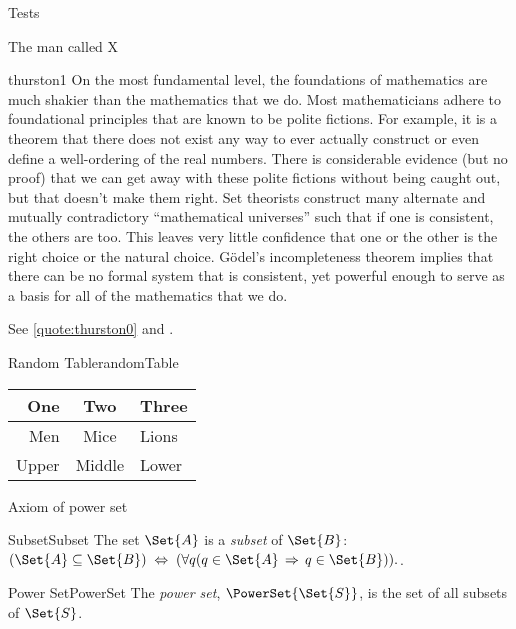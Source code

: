 \documentclass{PalisadesLakesBook}
\begin{document}
\begin{plSection}{Tests}
\begin{plSection}{The man called X}
\begin{plQuote}
{}
{thurston1}
{On the most fundamental level, the foundations of mathematics 
are much shakier than the mathematics that we do. 
Most mathematicians adhere to foundational principles 
that are known to be polite fictions. 
For example, it is a theorem that there does not exist any way 
to ever actually construct or even define a well-ordering
of the real numbers. 
There is considerable evidence (but no proof) that we can get
away with these polite fictions without being caught out, 
but that doesn’t make them right. 
Set theorists construct many alternate and mutually contradictory
“mathematical universes” such that if one is consistent, 
the others are too. 
This leaves very little confidence that one or the other is 
the right choice or the natural choice. 
G\"odel’s incompleteness theorem implies 
that there can be no formal system that is consistent, 
yet powerful enough to serve as a basis 
for all of the mathematics that we do.}%
\end{plQuote}

See \cref{quote:thurston0} and .

\end{plSection}%

\begin{plTable}{Random Table}{randomTable}
  \begin{tabular}{r|c|l}
  One   & Two    & Three \\\hline\hline
  Men   & Mice   & Lions \\\hline
  Upper & Middle & Lower
  \end{tabular}
  \end{plTable}

\begin{plSection}{Axiom of power set}
\label{sec:Axiom-of-power-set}

\begin{plDefinition}{Subset}{Subset}
The set $\Set{A}$ is a \textsl{subset} of $\Set{B}$:
$
(\Set{A} \subseteq \Set{B}) \;
 \Leftrightarrow \;
 (\forall q (q \in \Set{A} \, \Rightarrow \, q \in \Set{B})).
$.
\end{plDefinition}
 
\begin{plDefinition}{Power Set}{PowerSet}
The \emph{power set}, $\PowerSet{\Set{S}}$,
 is the set of all subsets of $\Set{S}$.
\end{plDefinition}


\end{plSection}
\end{plSection}
\end{document}
